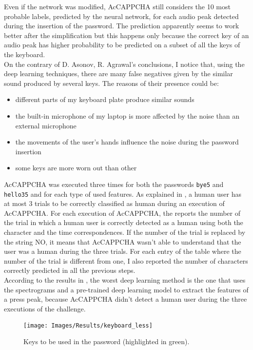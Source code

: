 Even if the network was modified, AcCAPPCHA still considers the 10 most probable labels, predicted by the neural network, for each audio peak detected during the insertion of the password. The prediction apparently seems to work better after the simplification but this happens only because the correct key of an audio peak has higher probability to be predicted on a subset of all the keys of the keyboard.\\
On the contrary of D. Asonov, R. Agrawal's conclusions\cite{keyboard_acoustic}, I notice that, using the deep learning techniques, there are many false negatives given by the similar sound produced by several keys. The reasons of their presence could be:
\begin{itemize}
\item{different parts of my keyboard plate produce similar sounds}
\item{the built-in microphone of my laptop is more affected by the noise than an external microphone}
\item{the movements of the user's hands influence the noise during the password insertion}
\item{some keys are more worn out than other} 
\end{itemize}
AcCAPPCHA was executed three times for both the passwords \texttt{bye5} and \texttt{hello35} and for each type of used features. As explained in , a human user has at most 3 trials to be correctly classified as human during an execution of AcCAPPCHA. For each execution of AcCAPPCHA, the  reports the number of the trial in which a human user is correctly detected as a human using both the character and the time correspondences. If the number of the trial is replaced by the string NO, it means that AcCAPPCHA wasn't able to understand that the user was a human during the three trials. For each entry of the table where the number of the trial is different from one, I also reported the number of characters correctly predicted in all the previous steps.\\
According to the results in , the worst deep learning method is the one that uses the spectrograms and a pre-trained deep learning model to extract the features of a press peak, because AcCAPPCHA didn't detect a human user during the three executions of the challenge.
\begin{figure}[H]
     \centering
	 \texttt{[image: Images/Results/keyboard\_less]}
     \caption{\footnotesize{Keys to be used in the password (highlighted in green).}}\label{Results:keyboard}
\end{figure}
